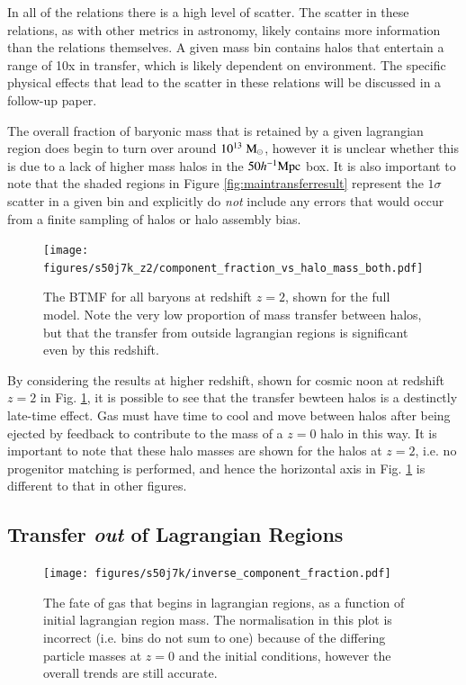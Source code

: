 In all of the relations there is a high level of scatter. The scatter in these
relations, as with other metrics in astronomy, likely contains more information 
than the relations themselves. A given mass bin contains halos that entertain a range
of 10x in transfer, which is likely dependent on environment. The specific physical
effects that lead to the scatter in these relations will be discussed in a follow-up
paper.

The overall fraction of baryonic mass that is retained by a given lagrangian
region does begin to turn over around $10^{13} \;{\rm M}_{\odot}{}$, however it is unclear
whether this is due to a lack of higher mass halos in the $50 h^{-1}{\rm Mpc}{}$ box. It
is also important to note that the shaded regions in Figure
\ref{fig:maintransferresult} represent the $1\sigma$ scatter in a given bin
and explicitly do \emph{not} include any errors that would occur from a finite
sampling of halos or halo assembly bias.

\begin{figure}
	\centering
	\texttt{[image: figures/s50j7k\_z2/component\_fraction\_vs\_halo\_mass\_both.pdf]}
	\vspace{-0.7cm}
	\caption{The BTMF for all baryons at redshift $z=2$, shown for
	the full \simba{} model. Note the very low proportion of mass transfer
	between halos, but that the transfer from outside lagrangian regions
	is significant even by this redshift.}
	\label{fig:z2resultlt}
\end{figure}

By considering the results at higher redshift, shown for cosmic noon at redshift
$z=2$ in Fig. \ref{fig:z2resultlt}, it is possible to see that the transfer
bewteen halos is a destinctly late-time effect. Gas must have time to cool and
move between halos after being ejected by feedback to contribute to the mass
of a $z=0$ halo in this way. It is important to note that these halo masses are
shown for the halos at $z=2$, i.e. no progenitor matching is performed, and hence
the horizontal axis in Fig. \ref{fig:z2resultlt} is different to that in other
figures.

\subsection{Transfer \emph{out} of Lagrangian Regions}

\begin{figure}
	\centering
	\texttt{[image: figures/s50j7k/inverse\_component\_fraction.pdf]}
	\vspace{-0.7cm}
	\caption{The fate of gas that begins in lagrangian regions, as a function of
	initial lagrangian region mass. The normalisation in this plot is incorrect
	(i.e. bins do not sum to one) because of the differing particle masses at 
	$z=0$ and the initial conditions, however the overall trends are still 
	accurate.  }
	\label{fig:transferoutoflrs}
\end{figure}

